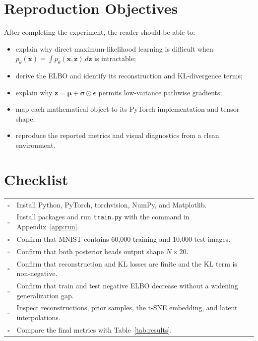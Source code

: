 \documentclass[11pt]{article}
\newcommand{\code}[1]{\texttt{#1}}
\begin{document}
\newpage
\section*{Reproduction Objectives}

After completing the experiment, the reader should be able to:

\begin{itemize}
  \item explain why direct maximum-likelihood learning is difficult when $p_\theta(\bm{x})=\int p_\theta(\bm{x},\bm{z})\,d\bm{z}$ is intractable;
  \item derive the ELBO and identify its reconstruction and KL-divergence terms;
  \item explain why $\bm{z}=\bm{\mu}+\bm{\sigma}\odot\bm{\epsilon}$ permits low-variance pathwise gradients;
  \item map each mathematical object to its PyTorch implementation and tensor shape;
  \item reproduce the reported metrics and visual diagnostics from a clean environment.
\end{itemize}

\section*{Checklist}

\begin{tabularx}{\textwidth}{@{}p{}X@{}}
  $\square$ & Install Python, PyTorch, torchvision, NumPy, and Matplotlib. \\
  $\square$ & Install packages and run \code{train.py} with the command in Appendix~\ref{app:run}. \\
  $\square$ & Confirm that MNIST contains 60,000 training and 10,000 test images. \\
  $\square$ & Confirm that both posterior heads output shape $N\times 20$. \\
  $\square$ & Confirm that reconstruction and KL losses are finite and the KL term is non-negative. \\
  $\square$ & Confirm that train and test negative ELBO decrease without a widening generalization gap. \\
  $\square$ & Inspect reconstructions, prior samples, the t-SNE embedding, and latent interpolations. \\
  $\square$ & Compare the final metrics with Table~\ref{tab:results}. \\
\end{tabularx}
\end{document}
